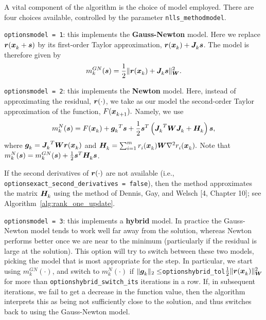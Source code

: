 A vital component of the algorithm is the choice of model employed.  There are four choices
available, controlled by the parameter {\tt  nlls\_method\ct model}.

\begin{description}
  \item {\tt options\ct model = 1}: this implements the {\bf Gauss-Newton} model.  Here we replace $\vr(\iter[k]{\vx} + \vs)$ by its first-order Taylor approximation, $\vr(\iter{\vx}) + \iter{\vJ}\vs$. The model is therefore given by    \begin{equation}
m_k^{GN}(\vs) = \frac{1}{2} \|\vr(\iter{\vx}) + \iter{\vJ}\vs\|_\vW^2.
\label{eq:gauss-newton-model}
\end{equation}
\item {\tt options\ct model = 2}: this implements the {\bf Newton} model.  
Here, instead of approximating the residual, $\vr(\cdot)$, we take as our model the second-order Taylor approximation of the function, $F(\iter[k+1]{\vx}).$  Namely, we use 
\begin{equation}
  \label{eq:newton-model}
  m_k^{N}(\vs) = F(\iter{\vx}) + {\iter{\vg}}^T\vs + \frac{1}{2}\vs^T\left( {\iter{\vJ}}^T \vW \iter{\vJ} + \iter{\vH}\right) \vs,
\end{equation}
where $\iter{\vg} = {\iter{\vJ}}^T\vW \vr(\iter{\vx})$ and $\iter{\vH} = \sum_{i=1}^m\iter[i]{r}(\iter{\vx}) \vW \nabla^2 \iter[i]{r}(\iter{\vx}).$
Note that $m_k^{N}(\vs) = m_k^{GN}(\vs) + \frac{1}{2}\vs^T\iter{\vH} \vs$.  

If the second derivatives of $\vr(\cdot)$ are not available 
(i.e., {\tt options\ct exact\_second\_derivatives = false}), 
then the method approximates the matrix $\iter{\vH}$ using the method of Dennis, Gay, and Welsch [4, Chapter 10]; 
see Algorithm~\ref{alg:rank_one_update}.


\item {\tt options\ct model = 3}: this implements a {\bf hybrid} model.  
In practice the Gauss-Newton model tends to work well far away from the solution, whereas
Newton performs better once we are near to the minimum (particularly if the residual is 
large at the solution).  
This option will try to switch between these two models, picking the model that is most appropriate for the step.  
In particular, we start using $m_k^{GN}(\cdot)$, 
and switch to $m_k^{N}(\cdot)$ if $\|{\iter{\vg}}\|_2 \leq ${\tt options\ct hybrid\_tol}$\frac{1}{2}\|\vr(\iter{\vx})\|^2_\vW$ for more than {\tt options\ct hybrid\_switch\_its} iterations in a row. If, in subsequent iterations, we fail to get 
a decrease in the function value, then the algorithm interprets this as being not sufficiently close to the solution, and thus switches back to using the Gauss-Newton model.


\end{description}
